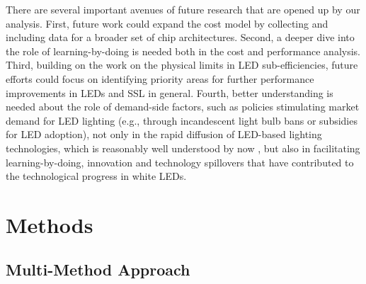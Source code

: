 \documentclass[parskip=full]{article}
\begin{document}
There are several important avenues of future research that are opened up by our analysis. First, future work could expand the cost model by collecting and including data for a broader set of chip architectures. Second, a deeper dive into the role of learning-by-doing is needed both in the cost and performance analysis. Third, building on the work on the physical limits in LED sub-efficiencies, future efforts could focus on identifying priority areas for further performance improvements in LEDs and SSL in general. Fourth, better understanding is needed about the role of demand-side factors, such as policies stimulating market demand for LED lighting (e.g., through incandescent light bulb bans or subsidies for LED adoption), not only in the rapid diffusion of LED-based lighting technologies, which is reasonably well understood by now \cite{Mills2014, Kamat2020, weinold2021quantifying, stegmaier2021incandescent, grubb2021new}, but also in facilitating learning-by-doing, innovation and technology spillovers that have contributed to the technological progress in white LEDs.

\section{Methods}
\label{sec:methods}

\subsection{Multi-Method Approach}
\end{document}
